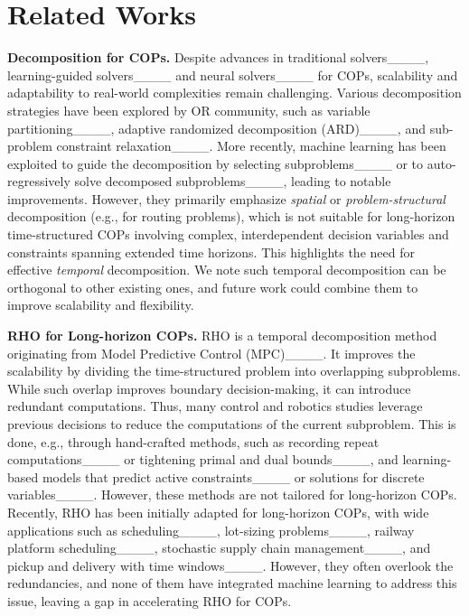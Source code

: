 \section{Related Works}
\label{sec:related_work}

\textbf{Decomposition for COPs.} Despite advances in traditional solvers____, learning-guided solvers____ and neural solvers____ for COPs, scalability and adaptability to real-world complexities remain challenging. Various decomposition strategies have been explored by OR community, such as variable partitioning____, adaptive randomized decomposition (ARD)____, and sub-problem constraint relaxation____. More recently, machine learning has been exploited to guide the decomposition by selecting subproblems____ or to auto-regressively solve decomposed subproblems____, leading to notable improvements. However, they primarily emphasize \emph{spatial} or \emph{problem-structural} decomposition (e.g., for routing problems), which is not suitable for long-horizon time-structured COPs involving complex, interdependent decision variables and constraints spanning extended time horizons. This highlights the need for effective \emph{temporal} decomposition. We note such temporal decomposition can be orthogonal to other existing ones, and future work could combine them to improve scalability and flexibility.

\textbf{RHO for Long-horizon COPs.}
RHO is a temporal decomposition method originating from Model Predictive Control (MPC)____. It improves the scalability by dividing the time-structured problem into overlapping subproblems. While such overlap improves boundary decision-making, it can introduce redundant computations. Thus, many control and robotics studies leverage previous decisions to reduce the computations of the current subproblem. This is done, e.g., through hand-crafted methods, such as recording repeat computations____ or tightening primal and dual bounds____, and learning-based models that predict active constraints____ or solutions for discrete variables____. However, these methods are not tailored for long-horizon COPs.
Recently, RHO has been initially adapted for long-horizon COPs, with wide applications such as scheduling____, lot-sizing problems____, railway platform scheduling____, stochastic supply chain management____, and pickup and delivery with time windows____. However, they often overlook the redundancies, and none of them have integrated machine learning to address this issue, leaving a gap in accelerating RHO for COPs.



